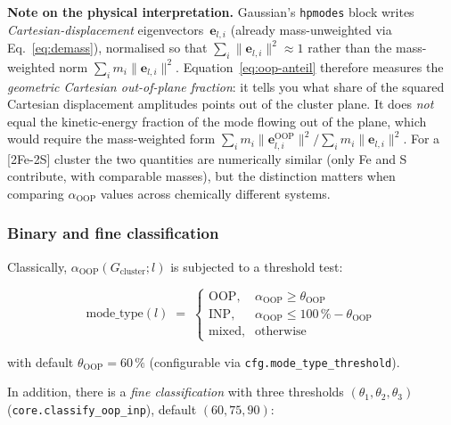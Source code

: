 \documentclass[11pt,a4paper,twoside]{article}
\newcommand{\evec}{\mathbf{e}}
\newcommand{\OOP}{\mathrm{OOP}}
\newcommand{\INP}{\mathrm{INP}}
\theoremstyle{remark}
\begin{document}
\begin{infobox}
\textbf{Note on the physical interpretation.}
Gaussian's \texttt{hpmodes} block writes
\emph{Cartesian-displacement} eigenvectors~$\evec_{l,i}$ (already
mass-unweighted via Eq.~\ref{eq:demass}), normalised so that
$\sum_i \lVert\evec_{l,i}\rVert^2 \approx 1$ rather than the
mass-weighted norm $\sum_i m_i \lVert\evec_{l,i}\rVert^2$.
Equation~\ref{eq:oop-anteil} therefore measures the
\emph{geometric Cartesian out-of-plane fraction}: it tells you
what share of the squared Cartesian displacement amplitudes points
out of the cluster plane. It does \emph{not} equal the kinetic-energy
fraction of the mode flowing out of the plane, which would require
the mass-weighted form
$\sum_i m_i \lVert\evec_{l,i}^{\OOP}\rVert^2 / \sum_i m_i \lVert\evec_{l,i}\rVert^2$.
For a [2Fe-2S] cluster the two quantities are numerically similar
(only Fe and S contribute, with comparable masses), but the
distinction matters when comparing $\alpha_{\OOP}$ values across
chemically different systems.
\end{infobox}

\subsubsection*{Binary and fine classification}

Classically, $\alpha_{\OOP}(G_{\text{cluster}}; l)$ is subjected to
a threshold test:

\begin{equation}
  \text{mode\_type}(l) \;=\;
  \begin{cases}
    \OOP, & \alpha_{\OOP} \geq \theta_{\text{OOP}} \\
    \INP, & \alpha_{\OOP} \leq 100\,\% - \theta_{\text{OOP}} \\
    \text{mixed}, & \text{otherwise}
  \end{cases}
\end{equation}

with default $\theta_{\text{OOP}} = 60\,\%$ (configurable via
\texttt{cfg.mode\_type\_threshold}).

In addition, there is a \emph{fine classification} with three
thresholds $(\theta_1, \theta_2, \theta_3)$
(\texttt{core.classify\_oop\_inp}), default $(60, 75, 90)$:
\end{document}

